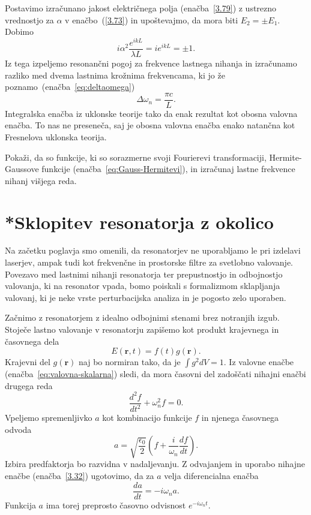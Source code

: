 Postavimo izračunano jakost električnega
polja (enačba~\ref{3.79}) z ustrezno vrednostjo za $\alpha$ v 
enačbo~(\ref{3.73}) in upoštevajmo, da mora biti
$E_{2}=\pm E_{1}$. Dobimo
\begin{equation}
i\alpha^{2}\frac{e^{ikL}}{\lambda L}=ie^{ikL}=\pm1.
\label{3.80}
\end{equation}
Iz tega izpeljemo resonančni pogoj za frekvence lastnega nihanja 
in izračunamo razliko med dvema lastnima krožnima frekvencama, 
ki jo že poznamo~(enačba~\ref{eq:deltaomega})
\begin{equation}
\Delta \omega_n=\frac{\pi c}{L}.
\label{3.81}
\end{equation}
Integralska enačba iz uklonske teorije tako da
enak rezultat kot obosna valovna enačba. To nas ne preseneča, saj je
obosna valovna enačba enako natančna kot Fresnelova uklonska teorija.

\begin{definition}
Pokaži, da so funkcije, ki so sorazmerne svoji Fourierevi transformaciji, 
Hermite-Gaussove funkcije (enačba~\ref{eq:Gauss-Hermitevi}), 
in izračunaj lastne frekvence nihanj višjega reda.
\end{definition}

\section{*Sklopitev resonatorja z okolico}
Na začetku poglavja smo omenili, da resonatorjev ne uporabljamo le pri 
izdelavi laserjev, ampak tudi kot frekvenčne in
prostorske filtre za svetlobno valovanje. Povezavo med lastnimi nihanji
resonatorja ter prepustnostjo in odbojnostjo valovanja, ki na resonator
vpada, bomo poiskali s formalizmom sklapljanja valovanj, 
ki je neke vrste perturbacijska analiza in je pogosto zelo uporaben.

Začnimo z resonatorjem z idealno odbojnimi stenami brez notranjih izgub. Stoječe
lastno valovanje v resonatorju zapišemo kot produkt krajevnega in časovnega
dela
\begin{equation}
E(\mathbf{r},t)=f(t)g(\mathbf{r}).
\label{3.31}
\end{equation}
Krajevni del $g(\mathbf{r})$ naj bo normiran tako, da je $\int g^{2}dV=1$. Iz valovne
enačbe (enačba~\ref{eq:valovna-skalarna}) sledi, da mora časovni del zadoščati 
nihajni enačbi drugega reda
\begin{equation}
\frac{d^2f}{dt^2} + \omega_{n}^{2}f=0.
\label{3.32}
\end{equation}
Vpeljemo spremenljivko $a$ kot kombinacijo funkcije $f$ in njenega
časovnega odvoda
\begin{equation}
a=\sqrt{\frac{\epsilon_{0}}{2}}(f+\frac{i}{\omega_{n}}\frac{df}{dt}).
\label{3.33}
\end{equation}
Izbira predfaktorja bo razvidna v nadaljevanju. 
Z odvajanjem in uporabo nihajne enačbe (enačba~\ref{3.32}) ugotovimo, da za $a$ velja 
diferencialna enačba 
\begin{equation}
\frac{da}{dt}=-i\omega_{n}a.
\label{3.34}
\end{equation}
Funkcija $a$ ima torej preprosto časovno odvisnost $e^{-i\omega_{n}t}$.

